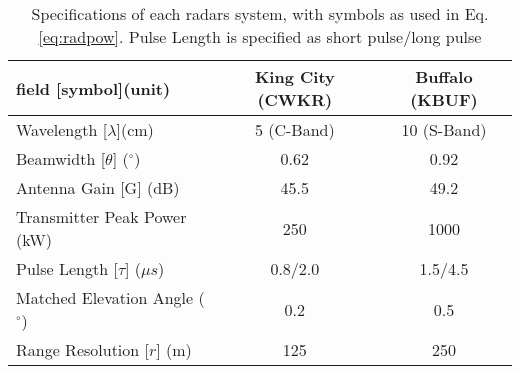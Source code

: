 \begin{table}[h]
    \caption{Specifications of each radars system, with symbols as used in Eq. \ref{eq:radpow}. Pulse Length is specified as short pulse/long pulse}\label{radarspecs}
    \begin{center}
    \begin{tabular}{|l|c|c|}
    \hline
     field [symbol](unit) & King City (CWKR) & Buffalo (KBUF) \\
    \hline\hline
    Wavelength [$\lambda$](cm) & 5 (C-Band) & 10 (S-Band) \\
    \hline
    Beamwidth [$\theta$] ($^\circ$)  & 0.62  & 0.92 \\
    \hline
     Antenna Gain [G] (dB) & 45.5 & 49.2 \\
    \hline
     Transmitter Peak Power (kW) & 250 & 1000 \\
    \hline
     Pulse Length [$\tau$] ($\mu s$) &  0.8/2.0 & 1.5/4.5 \\
    \hline
     Matched Elevation Angle ($^\circ$) & 0.2 & 0.5 \\
    \hline
     Range Resolution [$r$] (m)& 125 & 250 \\
    \hline
    \end{tabular}
    \end{center}
\end{table}


